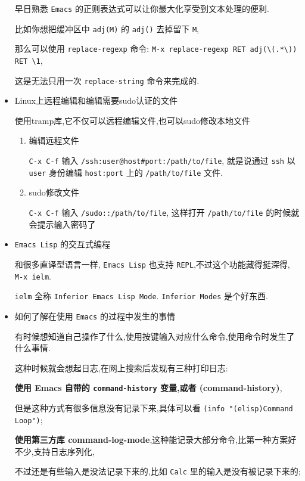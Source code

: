 \documentclass[11pt]{article}
\begin{document}
\begin{itemize}
早日熟悉 \texttt{Emacs} 的正则表达式可以让你最大化享受到文本处理的便利.

比如你想把缓冲区中 \texttt{adj(M)} 的 \texttt{adj()} 去掉留下 \texttt{M},

那么可以使用 \texttt{replace-regexp} 命令: \texttt{M-x replace-regexp RET adj(\textbackslash{}(.*\textbackslash{})) RET \textbackslash{}1},

这是无法只用一次 \texttt{replace-string} 命令来完成的.

\item Linux上远程编辑和编辑需要sudo认证的文件

使用tramp库,它不仅可以远程编辑文件,也可以sudo修改本地文件

\begin{enumerate}
\item 编辑远程文件

\texttt{C-x C-f} 输入 \texttt{/ssh:user@host\#port:/path/to/file}, 就是说通过 \texttt{ssh} 以 \texttt{user} 身份编辑 \texttt{host:port} 上的 \texttt{/path/to/file} 文件.

\item sudo修改文件

\texttt{C-x C-f} 输入 \texttt{/sudo::/path/to/file}, 这样打开 \texttt{/path/to/file} 的时候就会提示输入密码了
\end{enumerate}

\item \texttt{Emacs Lisp} 的交互式编程

和很多直译型语言一样, \texttt{Emacs Lisp} 也支持 \texttt{REPL},不过这个功能藏得挺深得, \texttt{M-x ielm}.

\texttt{ielm} 全称 \texttt{Inferior Emacs Lisp Mode}. \texttt{Inferior Modes} 是个好东西.

\item 如何了解在使用 \texttt{Emacs} 的过程中发生的事情

有时候想知道自己操作了什么,使用按键输入对应什么命令,使用命令时发生了什么事情.

这种时候就会想起日志,在网上搜索后发现有三种打印日志:

\textbf{使用 Emacs 自带的 \texttt{command-history} 变量,或者 (command-history)},

但是这种方式有很多信息没有记录下来,具体可以看 \texttt{(info "(elisp)Command Loop")};

\textbf{使用第三方库 command-log-mode},这种能记录大部分命令,比第一种方案好不少,支持日志序列化,

不过还是有些输入是没法记录下来的,比如 \texttt{Calc} 里的输入是没有被记录下来的;


\end{itemize}
\end{document}
